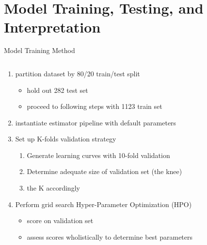 \documentclass[10pt, aspectratio=169, presentation]{beamer}
\begin{document}
\section{Model Training, Testing, and Interpretation}
\label{sec:org8e1df55}
\begin{frame}[label={sec:org2f549a8}]{Model Training Method}
\begin{columns}
\begin{column}{0.6\columnwidth}
\begin{enumerate}
\item partition dataset by 80/20 train/test split
\begin{itemize}
\item hold out 282 test set
\item proceed to following steps with 1123 train set
\end{itemize}
\item instantiate estimator pipeline with default parameters
\item Set up K-folds validation strategy
\begin{enumerate}
\item Generate learning curves with 10-fold validation
\item Determine adequate size of validation set (the knee)
\item the K accordingly
\end{enumerate}
\item Perform grid search Hyper-Parameter Optimization (HPO)
\begin{itemize}
\item score on validation set
\item assess scores wholistically to determine best parameters
\end{itemize}
\end{enumerate}
\end{column}

\begin{column}{0.4\columnwidth}
 
\begin{center}

\end{center}
\end{column}
\end{columns}
\end{frame}
\end{document}
